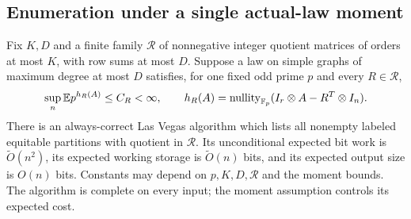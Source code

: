 \subsection{Enumeration under a single actual-law moment}
\begin{theorem}\label{vec:thm:moment}
Fix $K,D$ and a finite family $\mathcal R$ of nonnegative integer
quotient matrices of orders at most $K$, with row sums at most $D$.
Suppose a law on simple graphs of maximum degree at most $D$ satisfies,
for one fixed odd prime $p$ and every $R\in\mathcal R$,
\begin{equation}\label{eq:vector-moment}
 \sup_n\mathbb E p^{h_R(A)}\le C_R<\infty,\qquad
 h_R(A)=\operatorname{nullity}_{\mathbb F_p}(I_r\otimes A-R^T\otimes I_n).
\end{equation}
There is an always-correct Las Vegas algorithm which lists all
nonempty labeled equitable partitions with quotient in $\mathcal R$.
Its unconditional expected bit work is $\widetilde O(n^2)$, its
expected working storage is $\widetilde O(n)$ bits, and its expected
output size is $O(n)$ bits. Constants may depend on
$p,K,D,\mathcal R$ and the moment bounds. The algorithm is complete
on every input; the moment assumption controls its expected cost.
\end{theorem}
